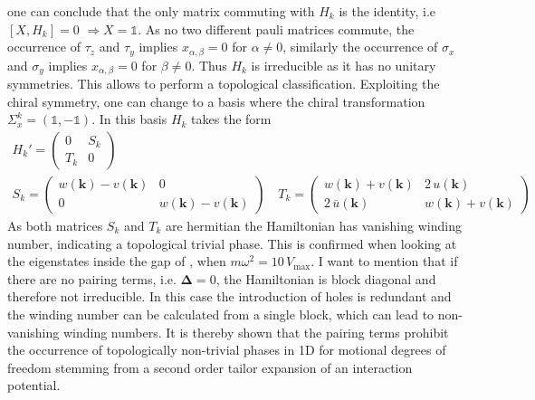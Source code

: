 one can conclude that the only matrix commuting with $H_k$ is the identity, i.e $[X,H_k]=0$ $\Rightarrow X=\mathbb{1}$. As no two different pauli matrices commute, the occurrence of $\tau_z$ and $\tau_y$ implies $x_{\alpha,\beta}=0$ for $\alpha\neq0$, similarly the occurrence of $\sigma_x$ and $\sigma_y$ implies $x_{\alpha,\beta}=0$ for $\beta\neq0$. Thus $H_k$ is irreducible as it has no unitary symmetries. This allows to perform a topological classification. Exploiting the chiral symmetry, one can change to a basis where the chiral transformation $\Sigma_x^k=(\mathbb{1},-\mathbb{1})$. In this basis $H_k$ takes the form
\begin{gather*}
    H_k' = \begin{pmatrix}
        0 & S_k\\
        T_k & 0
    \end{pmatrix}\\
    S_k = \begin{pmatrix}
        w(\mathbf{k})-v(\mathbf{k}) & 0\\
        0 & w(\mathbf{k})-v(\mathbf{k})
    \end{pmatrix}\quad T_k = \begin{pmatrix}
        w(\mathbf{k})+v(\mathbf{k}) & 2\,u(\mathbf{k})\\
        2\,\bar{u}(\mathbf{k}) & w(\mathbf{k}) + v(\mathbf{k})
    \end{pmatrix}
\end{gather*}
As both matrices $S_k$ and $T_k$ are hermitian the Hamiltonian has vanishing winding number, indicating a topological trivial phase. This is confirmed when looking at the eigenstates inside the gap of , when $m\omega^2=10\,V_\text{max}$. I want to mention that if there are no pairing terms, i.e. $\mathbf{\Delta}=0$, the Hamiltonian is block diagonal and therefore not irreducible. In this case the introduction of holes is redundant and the winding number can be calculated from a single block, which can lead to non-vanishing winding numbers. It is thereby shown that the pairing terms prohibit the occurrence of topologically non-trivial phases in 1D for motional degrees of freedom stemming from a second order tailor expansion of an interaction potential.




